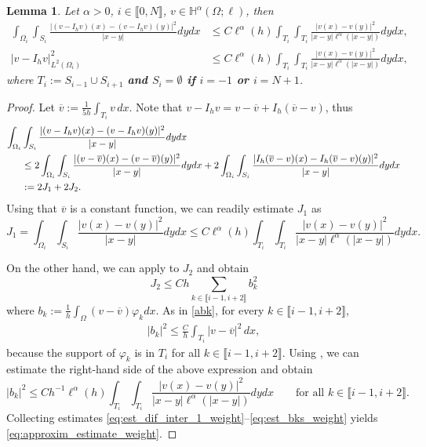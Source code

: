 \documentclass[11 pt]{article}
\newcommand\blue[1]{{\color{blue}\textbf{#1}}}
\newcommand\inter[1]{\llbracket #1\rrbracket}
\newtheorem{lemma}[theorem]{Lemma}
\numberwithin{equation}{section}
\newcommand{\weH}[1]{\mathbb H^{#1}(\Omega;\ell)}
\begin{document}
\begin{lemma}\label{lem:stab_dif_interp_weight}
Let $\alpha>0$, $i\in\inter{0,N}$, $v\in \weH{\alpha}$, then
\begin{align}
    \int_{\Omega_i}\int_{S_i}\frac{|(v-I_h v)(x)-(v-I_h v)(y)|^2}{|x-y|}dy dx &\leq C  \ell^{\alpha}(h)\int_{T_i}\int_{T_{i}}\frac{|v(x)-v(y)|^2}{|x-y|\ell^{\alpha}(|x-y|)}dy dx, \label{eq:approxim_estimate_weight}\\
    |v-I_h v|_{L^2(\Omega_i)}^2&\leq C\ell^{\alpha}(h)\int_{T_{i}}\int_{T_{i}}\frac{|v(x)-v(y)|^2}{|x-y|\ell^{\alpha}(|x-y|)}dy dx,\label{a4}
\end{align}
where $T_i:=S_{i-1}\cup S_{i+1}$ \blue{and $S_{i}=\emptyset$ if $i=-1$ or $i={N+1}$}.
\end{lemma}
%
\begin{proof}
Let $\overline{v}:=\frac{1}{5h}\int_{T_{i}} v\, dx$. Note that $v-I_h v=v-\overline{v}+I_h(\overline v - v)$, thus
%
\begin{align}\notag
    \int_{\Omega_i}&\int_{S_i}\frac{|(v-I_h v)(x)-(v-I_h v)(y)|^2}{|x-y|} dy dx \\ \notag
    &\leq 2\int_{\Omega_i}\int_{S_i}\frac{|(v-\overline{v})(x)-(v-\overline{v})(y)|^2}{|x-y|}dy dx + 2 \int_{\Omega_i}\int_{S_i}\frac{|I_h(\overline v-{v})(x)-I_h(\overline v-{v})(y)|^2}{|x-y|}dy dx \\ \label{eq:est_dif_inter_1_weight}
    &:=2J_1+2J_2.
\end{align}
%
Using that $\overline v$ is a constant function, we can readily estimate $J_1$ as
%
\begin{equation}\label{eq:est_J1_weight}
    J_1 = \int_{\Omega_i}\int_{S_i}\frac{|v(x)-v(y)|^2}{|x-y|}dy dx \leq C\ell^{\alpha}(h)\int_{T_i}\int_{T_i}\frac{|v(x)-v(y)|^2}{|x-y|\ell^{\alpha}(|x-y|)}dy dx.
\end{equation}

On the other hand, we can apply  to $J_2$ and obtain
%
\begin{equation}\label{eq:est_J2_weight}
    J_2 \leq Ch\sum_{k\in \inter{i-1,i+2}} b_k^2
\end{equation}
%
where $b_k:=\frac{1}{h}\int_{\Omega}(v-\overline v)\varphi_k dx$. As in \eqref{abk}, for every $k\in \inter{i-1,i+2}$,
\begin{align*}
    |b_k|^2\leq \frac{C}{h}\int_{T_{i}}|v-\overline{v}|^2\, dx,
\end{align*}
because the support of $\varphi_k$ is in $T_{i}$ for all $k\in \inter{i-1,i+2}$. Using , we can estimate the right-hand side of the above expression and obtain
%
\begin{equation}\label{eq:est_bks_weight}
    |b_k|^2\leq Ch^{-1}\ell^{\alpha}(h)\int_{T_{i}}\int_{T_{i}}\frac{|v(x)-v(y)|^2}{|x-y|\ell^{\alpha}(|x-y|)}dy dx\qquad \text{for all $k\in \inter{i-1,i+2}$}.
\end{equation}
%
Collecting estimates \eqref{eq:est_dif_inter_1_weight}--\eqref{eq:est_bks_weight} yields \eqref{eq:approxim_estimate_weight}. 


\end{proof}
\end{document}
